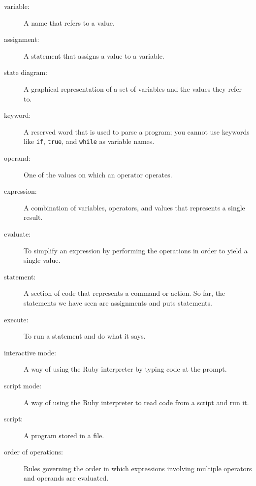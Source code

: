 \documentclass[10pt]{book}
\begin{document}
\begin{description}

\item[variable:]  A name that refers to a value.

\item[assignment:]  A statement that assigns a value to a variable.

\item[state diagram:]  A graphical representation of a set of variables and the
values they refer to.

\item[keyword:]  A reserved word that is used to parse a
program; you cannot use keywords like {\tt if}, {\tt  true}, and {\tt while} as
variable names.

\item[operand:]  One of the values on which an operator operates.

\item[expression:]  A combination of variables, operators, and values that
represents a single result.

\item[evaluate:]  To simplify an expression by performing the operations
in order to yield a single value.

\item[statement:]  A section of code that represents a command or action.  So
far, the statements we have seen are assignments and puts statements.

\item[execute:]  To run a statement and do what it says.

\item[interactive mode:] A way of using the Ruby interpreter by
typing code at the prompt.

\item[script mode:] A way of using the Ruby interpreter to read
code from a script and run it.

\item[script:] A program stored in a file.

\item[order of operations:]  Rules governing the order in which
expressions involving multiple operators and operands are evaluated.


\end{description}
\end{document}

